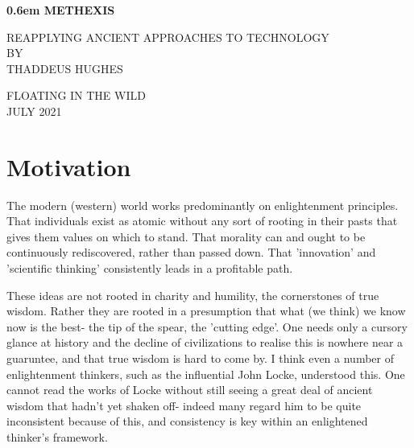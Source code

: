 \documentclass[10pt,letterpaper,openany]{book}
\begin{document}
\clearpage
\newcommand\nbvspace[1][3]{\vspace*{\stretch{#1}}}
\newcommand\nbstretchyspace{\spaceskip0.5em plus 0.25em minus 0.25em}
\newcommand{\nbtitlestretch}{\spaceskip0.6em}
\pagestyle{plain}
\begin{center}
  \bfseries
  \nbvspace[1]
  \Huge
  {\nbtitlestretch\huge
    METHEXIS}

  \nbvspace[1]
  \normalsize
  REAPPLYING ANCIENT APPROACHES TO TECHNOLOGY\\
  
  \nbvspace[1]
  \small BY\\
  \Large THADDEUS HUGHES\\

  \nbvspace[2]

  \nbvspace[3]
  \normalsize

  \large
  FLOATING IN THE WILD \\
  \small JULY 2021 \\
\end{center}

\raggedbottom


\chapter{Motivation}

The modern (western) world works predominantly on enlightenment principles. That individuals exist as atomic without any sort of rooting in their pasts that gives them values on which to stand. That morality can and ought to be continuously rediscovered, rather than passed down. That 'innovation' and 'scientific thinking' consistently leads in a profitable path.

These ideas are not rooted in charity and humility, the cornerstones of true wisdom. Rather they are rooted in a presumption that what (we think) we know now is the best- the tip of the spear, the 'cutting edge'. One needs only a cursory glance at history and the decline of civilizations to realise this is nowhere near a guaruntee, and that true wisdom is hard to come by. I think even a number of enlightenment thinkers, such as the influential John Locke, understood this. One cannot read the works of Locke without still seeing a great deal of ancient wisdom that hadn't yet shaken off- indeed many regard him to be quite inconsistent because of this, and consistency is key within an enlightened thinker's framework.
\end{document}
